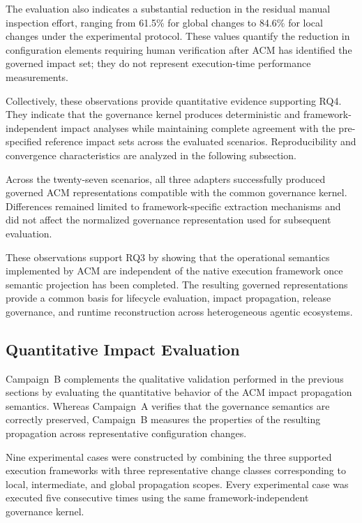 \documentclass[10pt]{article}
\begin{document}
The evaluation also indicates a substantial reduction in the residual manual inspection effort, ranging from 61.5\% for global changes to 84.6\% for local changes under the experimental protocol. These values quantify the reduction in configuration elements requiring human verification after ACM has identified the governed impact set; they do not represent execution-time performance measurements. 

Collectively, these observations provide quantitative evidence supporting RQ4. They indicate that the governance kernel produces deterministic and framework-independent impact analyses while maintaining complete agreement with the pre-specified reference impact sets across the evaluated scenarios. Reproducibility and convergence characteristics are analyzed in the following subsection.

Across the twenty-seven scenarios, all three adapters successfully produced governed ACM representations compatible with the common governance kernel. Differences remained limited to framework-specific extraction mechanisms and did not affect the normalized governance representation used for subsequent evaluation.

These observations support RQ3 by showing that the operational semantics implemented by ACM are independent of the native execution framework once semantic projection has been completed. The resulting governed representations provide a common basis for lifecycle evaluation, impact propagation, release governance, and runtime reconstruction across heterogeneous agentic ecosystems.

\subsection{Quantitative Impact Evaluation}
\label{sec:quantitative_impact}

Campaign~B complements the qualitative validation performed in the previous sections by evaluating the quantitative behavior of the ACM impact propagation semantics. Whereas Campaign~A verifies that the governance semantics are correctly preserved, Campaign~B measures the properties of the resulting propagation across representative configuration changes.

Nine experimental cases were constructed by combining the three supported execution frameworks with three representative change classes corresponding to local, intermediate, and global propagation scopes. Every experimental case was executed five consecutive times using the same framework-independent governance kernel.
\end{document}
